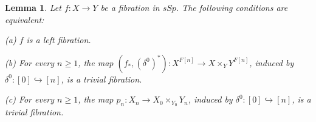 \documentclass[12pt]{amsart}
\theoremstyle{plain}
\newtheorem{Lem}[Thm]{Lemma}
\theoremstyle{definition}
\numberwithin{equation}{section}
\newcommand{\hra}{\hookrightarrow}
\newcommand{\dt}{\delta}
\begin{document}

\begin{Lem} \label{L:leftcart}
Let $f:X\to Y$ be a fibration in $sSp$. The following conditions
are equivalent:

(a) $f$ is a left fibration.

(b) For every $n\geq 1$, the map $(f_*,(\dt^0)^*):X^{F[n]}\to
X\times_Y Y^{F[n]}$, induced by $\dt^0:[0]\hra[n]$,
is a trivial fibration.

(c) For every $n\geq 1$, the map $p_n:X_{n}\to
X_0\times_{Y_0}Y_{n}$, induced by 
$\dt^0:[0]\hra[n]$, is a trivial fibration.
\end{Lem}
\end{document}
